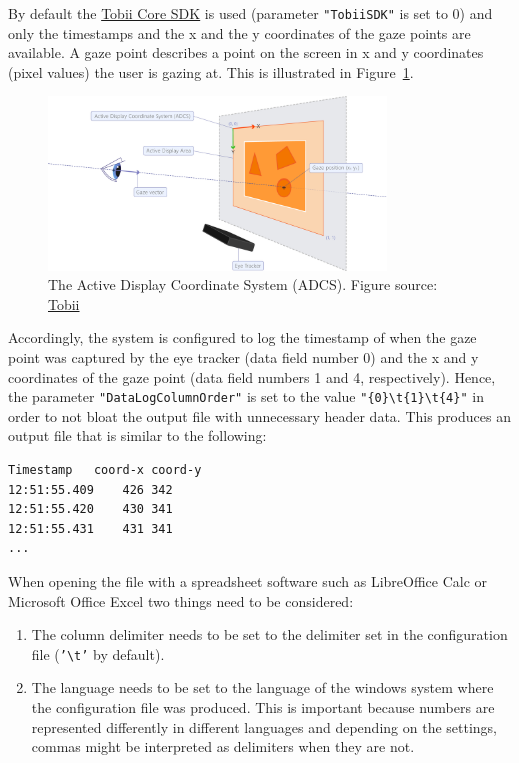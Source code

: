 \documentclass[a4paper,oneside]{book}
\begin{document}
By default the \href{http://developer.tobii.com/tobii-core-sdk/}{Tobii Core SDK} is used (parameter \texttt{"TobiiSDK"} is set to 0) and only the timestamps and the x and the y coordinates of the gaze points are available.
A gaze point describes a point on the screen in x and y coordinates (pixel values) the user is gazing at.
This is illustrated in Figure~\ref{fig.adcs}.
\begin{figure}[ht]
    \centering
    \includegraphics[width=0.8\textwidth]{adcs.png}
    \caption{The Active Display Coordinate System (ADCS). Figure source: \href{http://developer.tobiipro.com/commonconcepts/coordinatesystems.html}{Tobii}}
    \label{fig.adcs}
\end{figure}
Accordingly, the system is configured to log the timestamp of when the gaze point was captured by the eye tracker (data field number 0) and the x and y coordinates of the gaze point (data field numbers 1 and 4, respectively).
Hence, the parameter \texttt{"DataLogColumnOrder"} is set to the value \texttt{"\{0\}\textbackslash t\{1\}\textbackslash t\{4\}"} in order to not bloat the output file with unnecessary header data.
This produces an output file that is similar to the following:
\lstset{columns=flexible}
\lstset{keepspaces=true}
\begin{lstlisting}
Timestamp   coord-x coord-y
12:51:55.409    426 342
12:51:55.420    430 341
12:51:55.431    431 341
...
\end{lstlisting}

When opening the file with a spreadsheet software such as LibreOffice Calc or Microsoft Office Excel two things need to be considered:
\begin{enumerate}
    \item The column delimiter needs to be set to the delimiter set in the configuration file (\texttt{'\textbackslash t'} by default).
    \item The language needs to be set to the language of the windows system where the configuration file was produced.
        This is important because numbers are represented differently in different languages and depending on the settings, commas might be interpreted as delimiters when they are not.
\end{enumerate}
\end{document}
